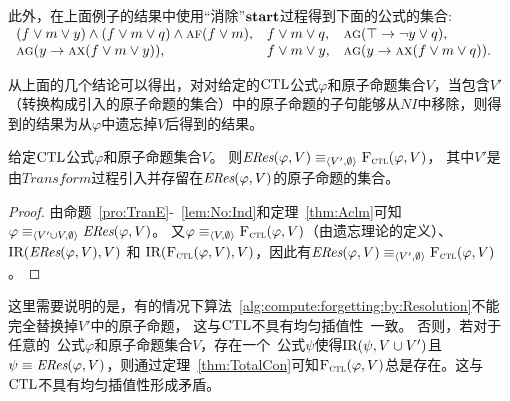 此外，在上面例子的结果中使用“消除”$\textbf{start}$过程得到下面的公式的集合:\\
$\begin{array}{lll}
	(f \vee m \vee y) \wedge (f \vee m\vee q) \wedge \textsc{a} \textsc{f} (f \vee m), &
	f\vee m \vee q, &
	\textsc{a}\textsc{g}(\top \rightarrow \neg y \vee q), \\
	\textsc{a}\textsc{g}(y \rightarrow \textsc{a} \textsc{x}(f \vee m \vee y)), &
	f \vee m \vee y, & 
	\textsc{a}\textsc{g}(y \rightarrow \textsc{a}\textsc{x}(f \vee m\vee q)).
\end{array}
$

从上面的几个结论可以得出，对对给定的$\textrm{CTL}$公式$\varphi$和原子命题集合$V$，当包含$V'$（转换构成引入的原子命题的集合）中的原子命题的子句能够从$NI$中移除，则得到的结果为从$\varphi$中遗忘掉$V$后得到的结果。

\begin{theorem}\label{thm:TotalCon}
	给定$\textrm{CTL}$公式$\varphi$和原子命题集合$V$。
	则$\emph{ERes}(\varphi,V)\equiv_{{\langle{V',\emptyset}\rangle}} {\textsc{F}_{\textsc{ctl}}}(\varphi,V)$，
	其中$V'$是由$Transform$过程引入并存留在$\emph{ERes}(\varphi,V)$的原子命题的集合。
\end{theorem}
\begin{proof}
	由命题~\ref{pro:TranE}-~\ref{lem:No:Ind}和定理~\ref{thm:Aclm}可知$\varphi \equiv_{{\langle{V'\cup V, \emptyset}\rangle}} \emph{ERes}(\varphi,V)$。
	又$\varphi \equiv_{{\langle{V,\emptyset}\rangle}} {\textsc{F}_{\textsc{ctl}}}(\varphi,V)$（由遗忘理论的定义）、$\textrm{IR}(\emph{ERes}(\varphi,V), V)$ 和 $\textrm{IR}({\textsc{F}_{\textsc{ctl}}}(\varphi,V), V)$，因此有$\emph{ERes}(\varphi,V)\equiv_{{\langle{V',\emptyset}\rangle}} {\textsc{F}_{\textsc{ctl}}}(\varphi,V)$。
\end{proof}

这里需要说明的是，有的情况下算法~\ref{alg:compute:forgetting:by:Resolution}不能完全替换掉$V'$中的原子命题，
这与$\textrm{CTL}$不具有均匀插值性~\cite{Maksimova:JANCL:1991}一致。
否则，若对于任意的\CTL\ 公式$\varphi$和原子命题集合$V$，存在一个\CTL\ 公式$\psi$使得$\textrm{IR}(\psi, V\cup V')$且$\psi \equiv \emph{ERes}(\varphi,V)$，则通过定理~\ref{thm:TotalCon}可知${\textsc{F}_{\textsc{ctl}}}(\varphi,V)$总是存在。这与$\textrm{CTL}$不具有均匀插值性形成矛盾。

